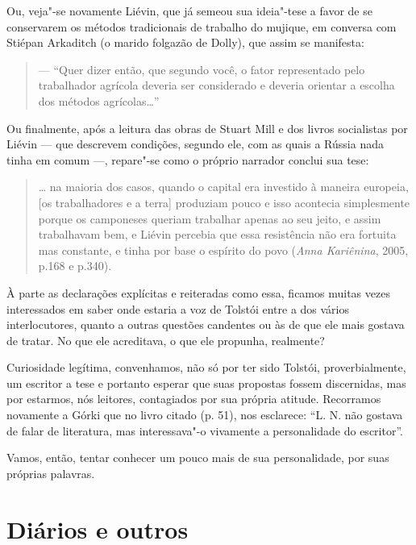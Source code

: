 Ou, veja"-se novamente Liévin, que já semeou sua ideia"-tese a
favor de se conservarem os métodos tradicionais de trabalho do
mujique, em conversa com Stiépan Arkaditch (o marido folgazão de
Dolly), que assim se manifesta:

\begin{quote}
--- ``Quer dizer então, que segundo você, o fator representado pelo
trabalhador agrícola deveria ser considerado e deveria orientar a
escolha dos métodos agrícolas\ldots{}''
\end{quote}

Ou finalmente, após a leitura das obras de Stuart Mill e dos livros
socialistas por Liévin --- que descrevem condições, segundo ele, com as
quais a Rússia nada tinha em comum ---, repare"-se como o próprio
narrador conclui sua tese:

\begin{quote}
\ldots{} na maioria dos casos, quando o capital era investido à maneira
europeia, [os trabalhadores e a terra] produziam pouco e isso
acontecia simplesmente porque os camponeses queriam trabalhar apenas ao
seu jeito, e assim trabalhavam bem, e Liévin percebia que essa
resistência não era fortuita mas constante, e tinha por base o espírito
do povo (\emph{Anna Kariênina}, 2005, p.168 e p.340).
\end{quote}


À parte as declarações explícitas e reiteradas como essa, ficamos muitas
vezes interessados em saber onde estaria a voz de Tolstói entre a dos
vários interlocutores, quanto a outras questões candentes ou às de que
ele mais gostava de tratar. No que ele acreditava, o que ele propunha,
realmente?

Curiosidade legítima, convenhamos, não só por ter sido Tolstói,
proverbialmente, um escritor a tese e portanto esperar que suas
propostas fossem discernidas, mas por estarmos, nós leitores,
contagiados por sua própria atitude. Recorramos novamente a
Górki que no livro citado (p. 51), nos esclarece: ``L. N. não gostava
de falar de literatura, mas interessava"-o vivamente a personalidade do
escritor''.

Vamos, então, tentar conhecer um pouco mais de sua personalidade, por
suas próprias palavras.


\chapter{Diários e outros}


